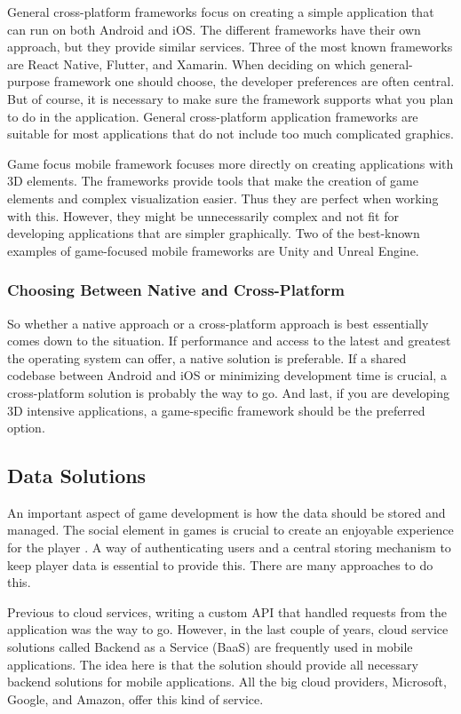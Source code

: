 General cross-platform frameworks focus on creating a simple application that can run on both Android and iOS. The different frameworks have their own approach, but they provide similar services. Three of the most known frameworks are React Native, Flutter, and Xamarin. When deciding on which general-purpose framework one should choose, the developer preferences are often central. But of course, it is necessary to make sure the framework supports what you plan to do in the application. General cross-platform application frameworks are suitable for most applications that do not include too much complicated graphics.

Game focus mobile framework focuses more directly on creating applications with 3D elements. The frameworks provide tools that make the creation of game elements and complex visualization easier. Thus they are perfect when working with this. However, they might be unnecessarily complex and not fit for developing applications that are simpler graphically. Two of the best-known examples of game-focused mobile frameworks are Unity and Unreal Engine.

\subsubsection{Choosing Between Native and Cross-Platform}
So whether a native approach or a cross-platform approach is best essentially comes down to the situation. If performance and access to the latest and greatest the operating system can offer, a native solution is preferable. If a shared codebase between Android and iOS or minimizing development time is crucial, a cross-platform solution is probably the way to go. And last, if you are developing 3D intensive applications, a game-specific framework should be the preferred option.

\subsection{Data Solutions}
An important aspect of game development is how the data should be stored and managed. The social element in games is crucial to create an enjoyable experience for the player \citep{sweetser_gameflow_2005}. A way of authenticating users and a central storing mechanism to keep player data is essential to provide this. There are many approaches to do this. 

Previous to cloud services, writing a custom API that handled requests from the application was the way to go. However, in the last couple of years, cloud service solutions called Backend as a Service (BaaS) are frequently used in mobile applications. The idea here is that the solution should provide all necessary backend solutions for mobile applications. All the big cloud providers, Microsoft, Google, and Amazon, offer this kind of service.


